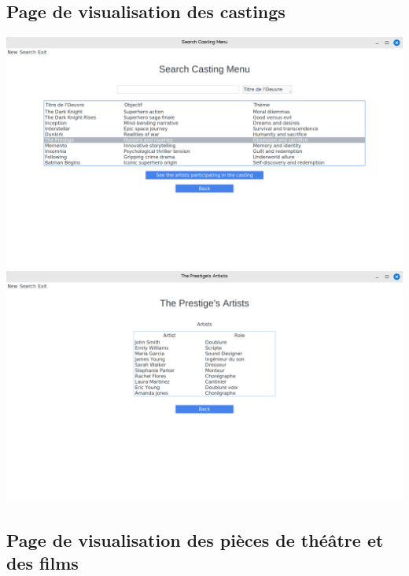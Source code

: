 \documentclass{article}
\begin{document}
\subsection{Page de visualisation des castings}
\begin{center}
  \includegraphics[scale=0.16]{casting.png}
  \includegraphics[scale=0.16]{castingartist.png}
\end{center}

\subsection{Page de visualisation des pièces de théâtre et des films}
\end{document}
